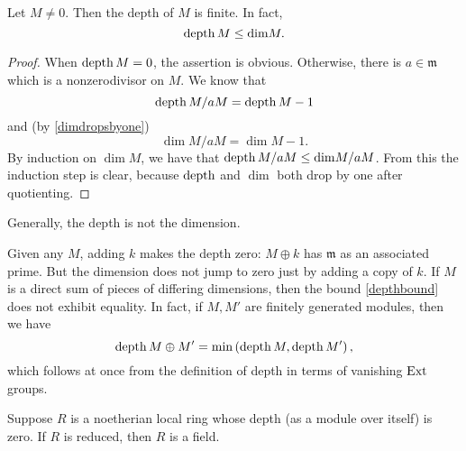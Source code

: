 \begin{corollary}\label{depthboundlocal} Let $M \neq 0$. Then the depth of $M$ is finite. In fact,
\begin{equation} \label{depthbound} \operatorname{depth} M \leq \mathrm{dim} M.  \end{equation}
\end{corollary}
\begin{proof}
When $\operatorname{depth} M = 0$, the assertion is obvious.
Otherwise,
there is $ a \in \mathfrak{m}$ which is a nonzerodivisor on $M$.
We know that
\[ \operatorname{depth} M/aM = \operatorname{depth} M -1  \]
and (by \cref{dimdropsbyone})
\[ \dim  M/aM = \dim  M -1.  \]
By induction on $\dim M$, we have that $\operatorname{depth} M/aM \leq \mathrm{dim} M/aM$.
From this the
induction step is clear, because $\operatorname{depth}$ and $\dim$ both drop by one after
quotienting.
\end{proof}

Generally, the depth is not the dimension.
\begin{example}
Given any $M$, adding $k$ makes the depth zero: $M \oplus k$
has $\mathfrak{m}$ as an associated prime. But the dimension
 does not
jump to zero just by adding a copy of $k$. If $M$ is a direct sum of pieces of
differing dimensions, then the bound \eqref{depthbound} does not exhibit
equality.
In fact, if $M, M'$ are finitely generated modules, then we have
\[ \operatorname{depth} M \oplus M' = \min \left(\operatorname{depth} M, \operatorname{depth} M' \right),  \]
which follows at once from the definition of depth in terms of
vanishing $\operatorname{Ext}$ groups.
\end{example}

\begin{exercise} 
Suppose $R$ is a noetherian local ring whose depth (as a module over itself)
is zero. If $R$ is reduced, then $R$ is a field. 
\end{exercise} 

